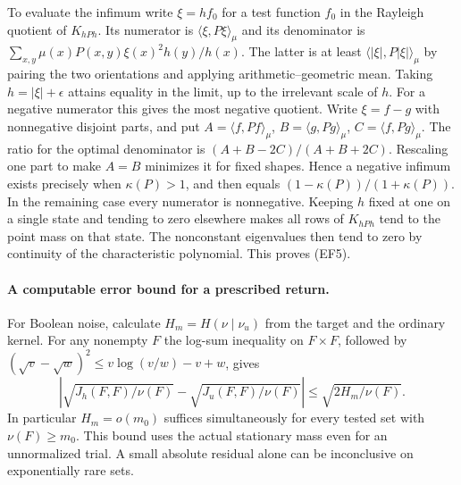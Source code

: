 To evaluate the infimum write $\xi=h f_0$ for a test function $f_0$
in the Rayleigh quotient of $K_{hPh}$. Its numerator is
$\langle\xi,P\xi\rangle_\mu$ and its denominator is
$\sum_{x,y}\mu(x)P(x,y)\xi(x)^2 h(y)/h(x)$.
The latter is at least $\langle|\xi|,P|\xi|\rangle_\mu$ by pairing
the two orientations and applying arithmetic--geometric mean.
Taking $h=|\xi|+\epsilon$ attains equality in the limit, up to the
irrelevant scale of $h$. For a negative numerator this gives the
most negative quotient. Write $\xi=f-g$ with nonnegative disjoint
parts, and put $A=\langle f,Pf\rangle_\mu$, $B=\langle g,Pg\rangle_\mu$,
$C=\langle f,Pg\rangle_\mu$. The ratio for the optimal denominator is
$(A+B-2C)/(A+B+2C)$. Rescaling one part to make $A=B$ minimizes it
for fixed shapes. Hence a negative infimum exists precisely when
$\kappa(P)>1$, and then equals $(1-\kappa(P))/(1+\kappa(P))$.
In the remaining case every numerator is nonnegative. Keeping $h$ fixed
at one on a single state and tending to zero elsewhere makes all rows
of $K_{hPh}$ tend to the point mass on that state. The nonconstant
eigenvalues then tend to zero by continuity of the characteristic
polynomial. This proves (EF5).

\paragraph{A computable error bound for a prescribed return.}
For Boolean noise, calculate $H_m=H(\nu\mid\nu_u)$ from the target and
the ordinary kernel. For any nonempty $F$ the log-sum inequality on
$F\times F$, followed by $(\sqrt v-\sqrt w)^2\le v\log(v/w)-v+w$,
gives
\[
 \left|\sqrt{J_h(F,F)/\nu(F)}-\sqrt{J_u(F,F)/\nu(F)}\right|
                 \le\sqrt{2H_m/\nu(F)}.                      \tag{EF3}
\]
In particular $H_m=o(m_0)$ suffices simultaneously for every tested
set with $\nu(F)\ge m_0$. This bound uses the actual stationary mass
even for an unnormalized trial. A small absolute residual alone can
be inconclusive on exponentially rare sets.

